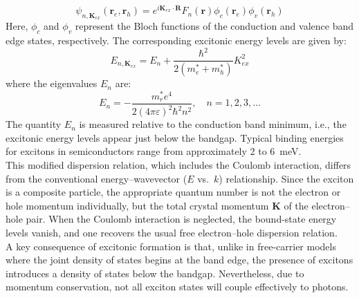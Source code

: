 \begin{equation}
	\psi_{n,\mathbf{K}_{ex}}(\mathbf{r}_e, \mathbf{r}_h) = e^{i \mathbf{K}_{ex} \cdot \mathbf{R}} F_n(\mathbf{r}) \phi_c(\mathbf{r}_e) \phi_v(\mathbf{r}_h)
\end{equation}
Here, \( \phi_c \) and \( \phi_v \) represent the Bloch functions of the conduction and valence band edge states, respectively. The corresponding excitonic energy levels are given by:
\begin{equation}
	E_{n,\mathbf{K}_{ex}} = E_n + \frac{\hbar^2}{2(m_e^* + m_h^*)} K_{ex}^2
\end{equation}
where the eigenvalues \( E_n \) are:
\begin{equation}
	E_n = - \frac{m_r^* e^4}{2 (4 \pi \varepsilon)^2 \hbar^2 n^2}, \quad n = 1, 2, 3, \dots
\end{equation}
The quantity \( E_n \) is measured relative to the conduction band minimum, i.e., the excitonic energy levels appear just below the bandgap. Typical binding energies for excitons in semiconductors range from approximately 2 to 6~meV.\\
This modified dispersion relation, which includes the Coulomb interaction, differs from the conventional energy–wavevector (\( E \) vs.\ \( k \)) relationship. Since the exciton is a composite particle, the appropriate quantum number is not the electron or hole momentum individually, but the total crystal momentum \( \mathbf{K} \) of the electron–hole pair. When the Coulomb interaction is neglected, the bound-state energy levels vanish, and one recovers the usual free electron–hole dispersion relation.\\
A key consequence of excitonic formation is that, unlike in free-carrier models where the joint density of states begins at the band edge, the presence of excitons introduces a density of states below the bandgap. Nevertheless, due to momentum conservation, not all exciton states will couple effectively to photons.
